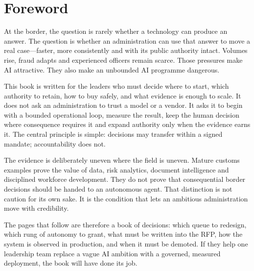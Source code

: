 \chapter*{Foreword}

At the border, the question is rarely whether a technology can produce
an answer. The question is whether an administration can use that answer
to move a real case---faster, more consistently and with its public
authority intact. Volumes rise, fraud adapts and experienced officers
remain scarce. Those pressures make AI attractive. They also make an
unbounded AI programme dangerous.

This book is written for the leaders who must decide where to start,
which authority to retain, how to buy safely, and what evidence is
enough to scale. It does not ask an administration to trust a model or a
vendor. It asks it to begin with a bounded operational loop, measure the
result, keep the human decision where consequence requires it and expand
authority only when the evidence earns it. The central principle is
simple: decisions may transfer within a signed mandate; accountability
does not.

The evidence is deliberately uneven where the field is uneven. Mature
customs examples prove the value of data, risk analytics, document
intelligence and disciplined workforce development. They do not prove
that consequential border decisions should be handed to an autonomous
agent. That distinction is not caution for its own sake. It is the
condition that lets an ambitious administration move with credibility.

The pages that follow are therefore a book of decisions: which queue to
redesign, which rung of autonomy to grant, what must be written into the
RFP, how the system is observed in production, and when it must be
demoted. If they help one leadership team replace a vague AI ambition
with a governed, measured deployment, the book will have done its job.

\clearpage
